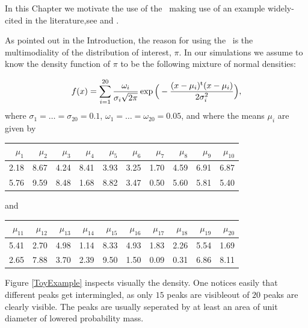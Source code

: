 \documentclass{book}
\begin{document}
In this Chapter we motivate the use of the \PT\, making use of an example widely-cited in the literature,see \cite{BaragattiParallelTemperingWithEquiEnergyMoves} and \citet*{FamingLiang}. 

As pointed out in the Introduction, the reason for using the \PT\, is the multimodiality of the distribution of interest, $\pi$. In our simulations we assume to know the density function of $\pi$ to be the following mixture of normal densities:

\begin{equation}\label{experimental pi}
f(x) = 
\sum_{i=1}^{20} \frac{\omega_i}{ \sigma_i \sqrt{2 \pi} } \exp \Big( -\frac{(x - \mu_i)^{\mathrm{t}} (x - \mu_i)}{2 \sigma_i^2} \Big),	
\end{equation}
where $\sigma_1 = \dots = \sigma_{20} = 0.1$, $\omega_1 = \dots = \omega_{20} = 0.05 $, and where  the means $\mu_i$ are given by

\begin{table}[ht]
	\centering
\begin{tabular}{rrrrrrrrrr}
  \hline
$\mu_1$ & $\mu_2$ & $\mu_3$ & $\mu_4$ & $\mu_5$ & $\mu_6$ & $\mu_7$ & $\mu_8$ & $\mu_9$ & $\mu_{10}$ \\ 
  \hline
2.18 & 8.67 & 4.24 & 8.41 & 3.93 & 3.25 & 1.70 & 4.59 & 6.91 & 6.87 \\ 
  5.76 & 9.59 & 8.48 & 1.68 & 8.82 & 3.47 & 0.50 & 5.60 & 5.81 & 5.40 \\ 
   \hline
\end{tabular}
\end{table}
and 

\begin{table}[ht]
	\centering
\begin{tabular}{rrrrrrrrrr}
  \hline
$\mu_{11}$ & $\mu_{12}$ & $\mu_{13}$ & $\mu_{14}$ & $\mu_{15}$ & $\mu_{16}$ & $\mu_{17}$ & $\mu_{18}$ & $\mu_{19}$ & $\mu_{20}$ \\ 
  \hline
5.41 & 2.70 & 4.98 & 1.14 & 8.33 & 4.93 & 1.83 & 2.26 & 5.54 & 1.69 \\ 
  2.65 & 7.88 & 3.70 & 2.39 & 9.50 & 1.50 & 0.09 & 0.31 & 6.86 & 8.11 \\ 
   \hline
\end{tabular}
\end{table}
 
Figure \ref{ToyExample} inspects visually the density. One notices easily that different peaks get intermingled, as only $15$ peaks are visibleout of $20$ peaks are clearly visible. The peaks are usually seperated by at least an area of unit diameter of lowered probability mass.   
\end{document}
